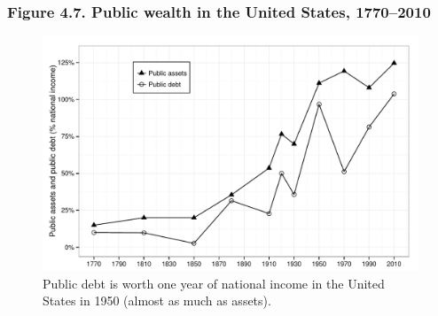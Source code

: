 \documentclass[t]{beamer}\usepackage[]{graphicx}\usepackage[]{color}
\newenvironment{knitrout}{}{} %
\begin{document}
\begin{frame}[label=Figure_4_7]
\frametitle{Figure 4.7. Public wealth in the United States, 1770--2010}
\begin{figure}[t]
\begin{minipage}[b]{\textwidth}
\centering
\begin{knitrout}\footnotesize
{}\color{fgcolor}

{\centering \includegraphics[width=1\linewidth]{figures/bw/Figure_4_7} 

}



\end{knitrout}
\caption{Public debt is worth one year of national income in the United States in 1950 (almost as much as assets).}
\end{minipage}
\end{figure}
\end{frame}
\end{document}
